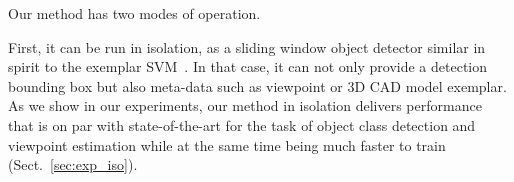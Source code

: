 % 
% 
% 
% 
% 
% 


Our method has two modes of operation.

First, it can be run in isolation, as a sliding window object
detector similar in spirit to the exemplar SVM~\cite{Malisiewicz11}. In
that case, it can not only provide a detection bounding box but also
meta-data such as viewpoint or 3D CAD model exemplar.
As we show in our experiments, our method in isolation delivers
performance that is on par with state-of-the-art for the task of
object class detection and viewpoint estimation while at the same time
being much faster to train (Sect.~\ref{sec:exp_iso}).


